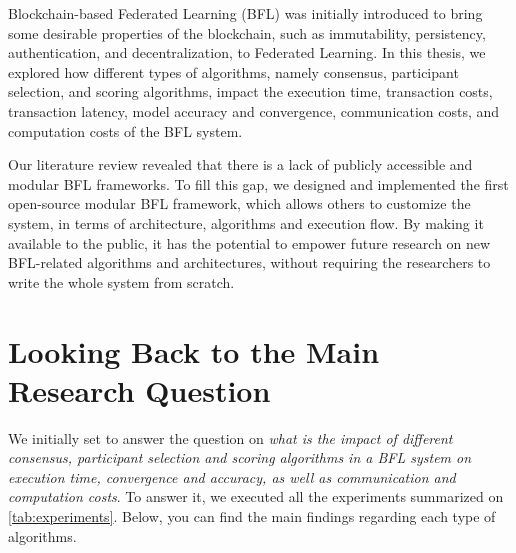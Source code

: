Blockchain-based Federated Learning (BFL) was initially introduced to bring some desirable properties of the blockchain, such as immutability, persistency, authentication, and decentralization, to Federated Learning. In this thesis, we explored how different types of algorithms, namely consensus, participant selection, and scoring algorithms, impact the execution time, transaction costs, transaction latency, model accuracy and convergence, communication costs, and computation costs of the BFL system.

Our literature review revealed that there is a lack of publicly accessible and modular BFL frameworks. To fill this gap, we designed and implemented the first open-source modular BFL framework, which allows others to customize the system, in terms of architecture, algorithms and execution flow. By making it available to the public, it has the potential to empower future research on new BFL-related algorithms and architectures, without requiring the researchers to write the whole system from scratch.

\section{Looking Back to the Main Research Question}

We initially set to answer the question on \textit{what is the impact of different consensus, participant selection and scoring algorithms in a BFL system on execution time, convergence and accuracy, as well as communication and computation costs}. To answer it, we executed all the experiments summarized on \autoref{tab:experiments}. Below, you can find the main findings regarding each type of algorithms.

